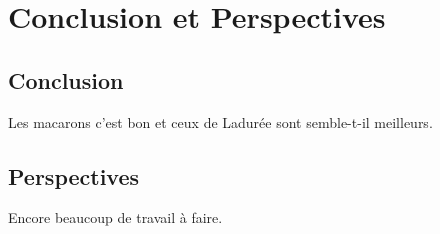 
\chapter{Conclusion et Perspectives}

\section{Conclusion}
Les macarons c'est bon et ceux de Ladurée sont semble-t-il meilleurs. \cite{F2012}

\section{Perspectives}
Encore beaucoup de travail à faire.